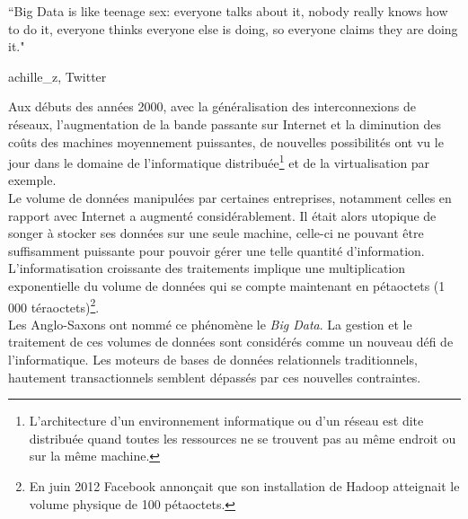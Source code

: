 \epigraph{``Big Data is like teenage sex: everyone talks about it, nobody really knows how to do it, everyone thinks everyone else is doing, so everyone claims they are doing it."}{\textup{achille\_z}, Twitter}

Aux débuts des années 2000, avec la généralisation des interconnexions de réseaux, l'augmentation de la bande passante sur Internet et la diminution des coûts des machines moyennement puissantes, de nouvelles possibilités ont vu le jour dans le domaine de l'informatique distribuée\footnote{L’architecture d'un environnement informatique ou d'un réseau est dite distribuée quand toutes les ressources ne se trouvent pas au même endroit ou sur la même machine.\cite{Wikipedia_architecture_distribuee}} et de la virtualisation par exemple.\\

Le volume de données manipulées par certaines entreprises, notamment celles en rapport avec Internet a augmenté considérablement. Il était alors utopique de songer à stocker ses données sur une seule machine, celle-ci ne pouvant être suffisamment puissante pour pouvoir gérer une telle quantité d'information. L'informatisation croissante des traitements implique une multiplication exponentielle du volume de données qui se compte maintenant en pétaoctets (1 000 téraoctets)\footnote{En juin 2012 Facebook annonçait que son installation de Hadoop atteignait le volume physique de 100 pétaoctets.\cite{facebook_hadoop}}.\\

Les Anglo-Saxons ont nommé ce phénomène le \textit{Big Data}. La gestion et le traitement de ces volumes de données sont considérés comme un nouveau défi de l'informatique. Les moteurs de bases de données relationnels traditionnels, hautement transactionnels semblent dépassés par ces nouvelles contraintes.